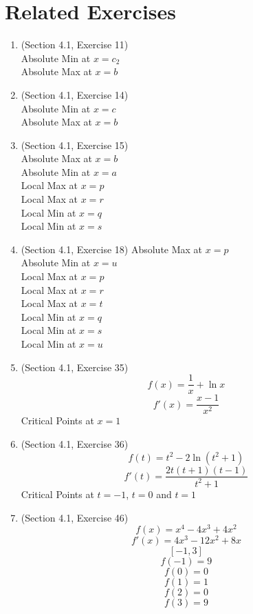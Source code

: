 \documentclass{article}
\begin{document}
\section*{Related Exercises}
\begin{enumerate}
    \item (Section 4.1, Exercise 11) \\
        Absolute Min at $x = c_2$ \\
        Absolute Max at $x = b$
    \item (Section 4.1, Exercise 14) \\
        Absolute Min at $x = c$ \\
        Absolute Max at $x = b$
    \item (Section 4.1, Exercise 15) \\
        Absolute Max at $x = b$ \\
        Absolute Min at $x = a$ \\
        Local Max at $x = p$ \\
        Local Max at $x = r$ \\
        Local Min at $x = q$ \\
        Local Min at $x = s$
    \item (Section 4.1, Exercise 18)
        Absolute Max at $x = p$ \\
        Absolute Min at $x = u$ \\
        Local Max at $x = p$ \\
        Local Max at $x = r$ \\
        Local Max at $x = t$ \\
        Local Min at $x = q$ \\
        Local Min at $x = s$ \\
        Local Min at $x = u$ \\
    \item (Section 4.1, Exercise 35)
        $$f(x) = \frac{1}{x} + \ln{x}$$
        $$f'(x) = \frac{x-1}{x^2}$$
        Critical Points at $x = 1$
    \item (Section 4.1, Exercise 36)
        $$f(t) = t^2 - 2\ln{\left(t^2 + 1\right)}$$
        $$f'(t) = \frac{2t\left(t+1\right)\left(t-1\right)}{t^2 + 1}$$
        Critical Points at $t = -1$, $t = 0$ and $t = 1$
    \item (Section 4.1, Exercise 46)
        $$f(x) = x^4 - 4x^3 + 4x^2$$
        $$f'(x) = 4x^3 - 12x^2 + 8x$$
        $$[-1, 3]$$
        $$f(-1) = 9$$
        $$f(0) = 0$$
        $$f(1) = 1$$
        $$f(2) = 0$$
        $$f(3) = 9$$

\end{enumerate}
\end{document}
